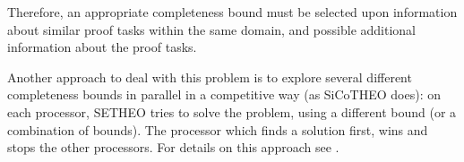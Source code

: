 Therefore, an appropriate completeness bound must be selected upon information
about similar proof tasks within the same domain, and possible additional
information about the proof tasks.

Another approach to deal with this problem is to explore several different
completeness bounds in parallel in a competitive way (as SiCoTHEO does):
on each processor, SETHEO tries to solve the problem, using a different
bound (or a combination of bounds). The processor which finds a solution
first, wins and stops the other processors.
For details on this approach see \cite{Sch96ppai}.